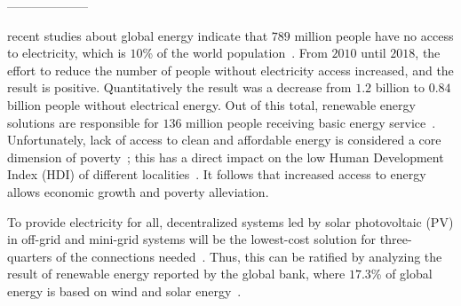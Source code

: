 \documentclass[10pt,journal,compsoc]{IEEEtran}
\begin{document}
\maketitle

%
\IEEEpeerreviewmaketitle



% 
% 
% 
% 
--------------------
 
 recent studies about global energy indicate that $789$ million people have no access to electricity, which is $10$\% of the world population~\cite{Energyprogressreport}. From $2010$ until $2018$, the effort to reduce the number of people without electricity access increased, and the result is positive. Quantitatively the result was a decrease from $1.2$ billion to $0.84$ billion people without electrical energy. Out of this total, renewable energy solutions are responsible for $136$ million people receiving basic energy service~\cite{Energyprogressreport}. Unfortunately, lack of access to clean and affordable energy is considered a core dimension of poverty~\cite{Hussein2012}; this has a direct impact on the low Human Development Index (HDI) of different localities~\cite{Coelho}. It follows that increased access to energy allows economic growth and poverty alleviation\cite{Karekesi}. 

To provide electricity for all, decentralized systems led by solar photovoltaic (PV) in off-grid and mini-grid systems will be the lowest-cost solution for three-quarters of the connections needed~\cite{Hussein2012}. Thus, this can be ratified by analyzing the result of renewable energy reported by the global bank, where $17.3$\%  of global energy is based on wind and solar energy~\cite{Energyprogressreport}.
\end{document}
